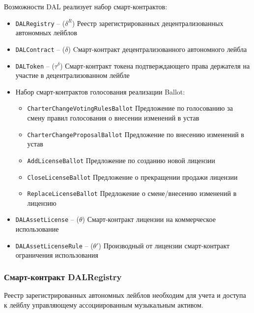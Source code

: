 \documentclass[12pt]{report}
\def\code#1{\colorbox{light-gray}{\texttt{#1}}}
\begin{document}
\begin{multicols}{2}
Возможности DAL реализует набор смарт-контрактов:
\begin{itemize}
	\item\code{DALRegistry} – ($\delta^R$)\hfill\null\linebreak
	Реестр зарегистрированных децентрализованных автономных лейблов
	\item\code{DALContract} – ($\delta$)\hfill\null\linebreak
	Cмарт-контракт децентрализованного автономного лейбла
	\item\code{DALToken} – ($\tau^\delta$)\hfill\null\linebreak
	Смарт-контракт токена подтверждающего права держателя на участие в децентрализованном лейбле
	\item Набор смарт-контрактов голосования реализации Ballot:
	\begin{itemize}
		\item\code{CharterChangeVotingRulesBallot}
		Предложение по голосованию за смену правил голосования о внесении изменений в устав
		\item\code{CharterChangeProposalBallot}\hfill\null\linebreak
		Предложение по внесению изменений в устав
		\item\code{AddLicenseBallot}\hfill\null\linebreak
		Предложение по созданию новой лицензии
		\item\code{CloseLicenseBallot}\hfill\null\linebreak
		Предложение о прекращении продажи лицензии
		\item\code{ReplaceLicenseBallot}\hfill\null\linebreak
		Предложение о смене/внесению изменений в лицензию
	\end{itemize}
\item\code{DALAssetLicense} – ($\theta$)\hfill\null\linebreak
Смарт-контракт лицензии на коммерческое использование
\item\code{DALAssetLicenseRule} – ($\theta'$)\hfill\null\linebreak
Производный от лицензии смарт-контракт ограничения использования
\end{itemize}
\end{multicols}
\vfill\null\pagebreak
\subsubsection{Смарт-контракт DALRegistry}
\label{tech-apps-dal-registry}
Реестр зарегистрированных автономных лейблов необходим для учета и доступа к лейблу управляющему ассоциированным музыкальным активом.
\end{document}
